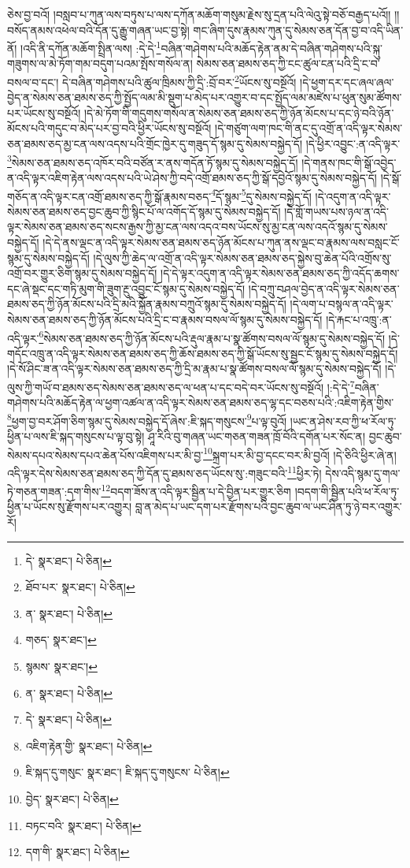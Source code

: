 ཅེས་བྱ་བའོ། །བསླབ་པ་ཀུན་ལས་བཏུས་པ་ལས་དཀོན་མཆོག་གསུམ་རྗེས་སུ་དྲན་པའི་ལེའུ་སྟེ་བཅོ་བརྒྱད་པའོ།། །།བསོད་ནམས་འཕེལ་བའི་དོན་དུ་རྒྱུ་གཞན་ཡང་བྱ་སྟེ། གང་ཞིག་དུས་རྣམས་ཀུན་དུ་སེམས་ཅན་དོན་བྱ་བ་འདི་ཡིན་ནོ། །འདི་ནི་དཀོན་མཆོག་སྤྲིན་ལས། :དེ་དེ་\footnote{དེ་  སྣར་ཐང་།  པེ་ཅིན། }བཞིན་གཤེགས་པའི་མཆོད་རྟེན་ནམ་དེ་བཞིན་གཤེགས་པའི་སྐུ་གཟུགས་ལ་མེ་ཏོག་གམ་བདུག་པའམ་སྤོས་གསོལ་ན། སེམས་ཅན་ཐམས་ཅད་ཀྱི་ངང་ཚུལ་ངན་པའི་དྲི་ང་བ་བསལ་བ་དང་། དེ་བཞིན་གཤེགས་པའི་ཚུལ་ཁྲིམས་ཀྱི་དྲི་:བྲོ་བར་\footnote{ཐོབ་པར་  སྣར་ཐང་།  པེ་ཅིན། }ཡོངས་སུ་བསྔོའོ། །དེ་ཕྱག་དར་དང་ཞལ་ཞལ་བྱེད་ན་སེམས་ཅན་ཐམས་ཅད་ཀྱི་སྤྱོད་ལམ་མི་སྡུག་པ་མེད་པར་འགྱུར་བ་དང་སྤྱོད་ལམ་མཛེས་པ་ཕུན་སུམ་ཚོགས་པར་ཡོངས་སུ་བསྔོའོ། །དེ་མེ་ཏོག་གི་གདུགས་གསོལ་ན་སེམས་ཅན་ཐམས་ཅད་ཀྱི་ཉོན་མོངས་པ་དང་ཉེ་བའི་ཉོན་མོངས་པའི་གདུང་བ་མེད་པར་བྱ་བའི་ཕྱིར་ཡོངས་སུ་བསྔོའོ། །དེ་གཙུག་ལག་ཁང་གི་ནང་དུ་འགྲོ་ན་འདི་ལྟར་སེམས་ཅན་ཐམས་ཅད་མྱ་ངན་ལས་འདས་པའི་གྲོང་ཁྱེར་དུ་གཟུད་དོ་སྙམ་དུ་སེམས་བསྐྱེད་དོ། །དེ་ཕྱིར་འབྱུང་:ན་འདི་ལྟར་\footnote{ན་  སྣར་ཐང་།  པེ་ཅིན། }སེམས་ཅན་ཐམས་ཅད་འཁོར་བའི་བཙོན་ར་ནས་གདོན་ཏོ་སྙམ་དུ་སེམས་བསྐྱེད་དོ། །དེ་གནས་ཁང་གི་སྒོ་འབྱེད་ན་འདི་ལྟར་འཇིག་རྟེན་ལས་འདས་པའི་ཡེ་ཤེས་ཀྱི་བདེ་འགྲོ་ཐམས་ཅད་ཀྱི་སྒོ་དབྱེའོ་སྙམ་དུ་སེམས་བསྐྱེད་དོ། །དེ་སྒོ་གཅོད་ན་འདི་ལྟར་ངན་འགྲོ་ཐམས་ཅད་ཀྱི་སྒོ་རྣམས་བཅད་\footnote{གཅད་  སྣར་ཐང་། }དོ་སྙམ་\footnote{སྙམས་  སྣར་ཐང་། }དུ་སེམས་བསྐྱེད་དོ། །དེ་འདུག་ན་འདི་ལྟར་སེམས་ཅན་ཐམས་ཅད་བྱང་ཆུབ་ཀྱི་སྙིང་པོ་ལ་འགོད་དོ་སྙམ་དུ་སེམས་བསྐྱེད་དོ། །དེ་གློ་གཡས་པས་ཉལ་ན་འདི་ལྟར་སེམས་ཅན་ཐམས་ཅད་སངས་རྒྱས་ཀྱི་མྱ་ངན་ལས་འདའ་བས་ཡོངས་སུ་མྱ་ངན་ལས་འདའོ་སྙམ་དུ་སེམས་བསྐྱེད་དོ། །དེ་དེ་ནས་ལྡང་ན་འདི་ལྟར་སེམས་ཅན་ཐམས་ཅད་ཉོན་མོངས་པ་ཀུན་ནས་ལྡང་བ་རྣམས་ལས་བསླང་ངོ་སྙམ་དུ་སེམས་བསྐྱེད་དོ། །དེ་ལུས་ཀྱི་ཆེད་ལ་འགྲོ་ན་འདི་ལྟར་སེམས་ཅན་ཐམས་ཅད་སྐྱེས་བུ་ཆེན་པོའི་འགྲོས་སུ་འགྲོ་བར་གྱུར་ཅིག་སྙམ་དུ་སེམས་བསྐྱེད་དོ། །དེ་དེ་ལྟར་འདུག་ན་འདི་ལྟར་སེམས་ཅན་ཐམས་ཅད་ཀྱི་འདོད་ཆགས་དང་ཞེ་སྡང་དང་གཏི་མུག་གི་ཟུག་རྔུ་འབྱུང་ངོ་སྙམ་དུ་སེམས་བསྐྱེད་དོ། །དེ་བཀྲུ་བཤལ་བྱེད་ན་འདི་ལྟར་སེམས་ཅན་ཐམས་ཅད་ཀྱི་ཉོན་མོངས་པའི་དྲི་མའི་སྐྱོན་རྣམས་བཀྲུའོ་སྙམ་དུ་སེམས་བསྐྱེད་དོ། །དེ་ལག་པ་བསྙལ་ན་འདི་ལྟར་སེམས་ཅན་ཐམས་ཅད་ཀྱི་ཉོན་མོངས་པའི་དྲི་ང་བ་རྣམས་བསལ་ལོ་སྙམ་དུ་སེམས་བསྐྱེད་དོ། །དེ་རྐང་པ་འཁྲུ་:ན་འདི་ལྟར་\footnote{ན་  སྣར་ཐང་།  པེ་ཅིན། }སེམས་ཅན་ཐམས་ཅད་ཀྱི་ཉོན་མོངས་པའི་རྡུལ་རྣམ་པ་སྣ་ཚོགས་བསལ་ལོ་སྙམ་དུ་སེམས་བསྐྱེད་དོ། །དེ་གདོང་འཁྲུ་ན་འདི་ལྟར་སེམས་ཅན་ཐམས་ཅད་ཀྱི་ཆོས་ཐམས་ཅད་ཀྱི་སྒོ་ཡོངས་སུ་སྦྱང་ངོ་སྙམ་དུ་སེམས་བསྐྱེད་དོ། །དེ་སོ་ཤིང་ཟ་ན་འདི་ལྟར་སེམས་ཅན་ཐམས་ཅད་ཀྱི་དྲི་མ་རྣམ་པ་སྣ་ཚོགས་བསལ་ལོ་སྙམ་དུ་སེམས་བསྐྱེད་དོ། །དེ་ལུས་ཀྱི་གཡོ་བ་ཐམས་ཅད་སེམས་ཅན་ཐམས་ཅད་ལ་ཕན་པ་དང་བདེ་བར་ཡོངས་སུ་བསྔོའོ། །:དེ་དེ་\footnote{དེ་  སྣར་ཐང་།  པེ་ཅིན། }བཞིན་གཤེགས་པའི་མཆོད་རྟེན་ལ་ཕྱག་འཚལ་ན་འདི་ལྟར་སེམས་ཅན་ཐམས་ཅད་ལྷ་དང་བཅས་པའི་:འཇིག་རྟེན་གྱིས་\footnote{འཇིག་རྟེན་གྱི་  སྣར་ཐང་།  པེ་ཅིན། }ཕྱག་བྱ་བར་ཤོག་ཅིག་སྙམ་དུ་སེམས་བསྐྱེད་དོ་ཞེས་:ཇི་སྐད་གསུངས་\footnote{ཇི་སྐད་དུ་གསུང་  སྣར་ཐང་། ཇི་སྐད་དུ་གསུངས་  པེ་ཅིན། }པ་ལྟ་བུའོ། །ཡང་ན་ཤེས་རབ་ཀྱི་ཕ་རོལ་ཏུ་ཕྱིན་པ་ལས་ཇི་སྐད་གསུངས་པ་ལྟ་བུ་སྟེ། ཤཱ་རིའི་བུ་གཞན་ཡང་གཅན་གཟན་ཁྲོ་བོའི་དགོན་པར་སོང་ན། བྱང་ཆུབ་སེམས་དཔའ་སེམས་དཔའ་ཆེན་པོས་འཇིགས་པར་མི་བྱ་\footnote{བྱེད་  སྣར་ཐང་།  པེ་ཅིན། }སྐྲག་པར་མི་བྱ་དངང་བར་མི་བྱའོ། །དེ་ཅིའི་ཕྱིར་ཞེ་ན། འདི་ལྟར་དེས་སེམས་ཅན་ཐམས་ཅད་ཀྱི་དོན་དུ་ཐམས་ཅད་ཡོངས་སུ་:གཟུང་བའི་\footnote{བཏང་བའི་  སྣར་ཐང་།  པེ་ཅིན། }ཕྱིར་ཏེ། དེས་འདི་སྙམ་དུ་གལ་ཏེ་གཅན་གཟན་:དག་གིས་\footnote{དག་གི་  སྣར་ཐང་།  པེ་ཅིན། }བདག་ཟོས་ན་འདི་ལྟར་སྦྱིན་པ་དེ་བྱིན་པར་གྱུར་ཅིག །བདག་གི་སྦྱིན་པའི་ཕ་རོལ་ཏུ་ཕྱིན་པ་ཡོངས་སུ་རྫོགས་པར་འགྱུར། བླ་ན་མེད་པ་ཡང་དག་པར་རྫོགས་པའི་བྱང་ཆུབ་ལ་ཡང་ཤིན་ཏུ་ཉེ་བར་འགྱུར་རོ། 